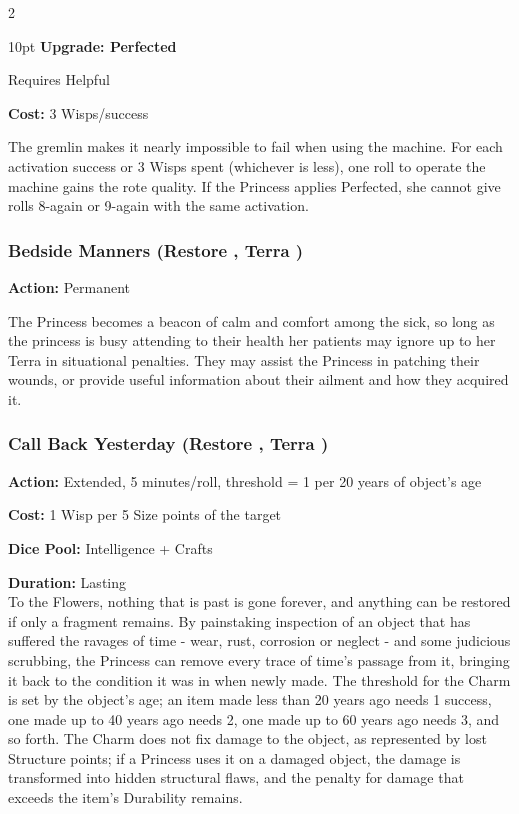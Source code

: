 \begin{multicols}{2}
\begin{myindentpar}{10pt}
\textbf{Upgrade: Perfected}

Requires Helpful

\noindent \textbf{Cost:} 3 Wisps/success

The gremlin makes it nearly impossible to fail when using the machine. For each activation success or 3 Wisps spent (whichever is less), one roll to operate the machine gains the rote quality. If the Princess applies Perfected, she cannot give rolls 8-again or 9-again with the same activation.\end{myindentpar}

\subsubsection*{Bedside Manners (Restore \textbullet, Terra \textbullet)}

\noindent \textbf{Action:} Permanent

\noindent The Princess becomes a beacon of calm and comfort among the sick, so long as the princess is busy attending to their health her patients may ignore up to her Terra in situational penalties. They may assist the Princess in patching their wounds, or provide useful information about their ailment and how they acquired it. 

\subsubsection*{Call Back Yesterday (Restore \textbullet, Terra \textbullet)}

\noindent \textbf{Action:} Extended, 5 minutes/roll, threshold = 1 per 20 years of object's age

\noindent \textbf{Cost:} 1 Wisp per 5 Size points of the target

\noindent \textbf{Dice Pool:} Intelligence + Crafts

\noindent \textbf{Duration:} Lasting \\

\noindent To the Flowers, nothing that is past is gone forever, and anything can be restored if only a fragment remains. By painstaking inspection of an object that has suffered the ravages of time - wear, rust, corrosion or neglect - and some judicious scrubbing, the Princess can remove every trace of time's passage from it, bringing it back to the condition it was in when newly made. The threshold for the Charm is set by the object's age; an item made less than 20 years ago needs 1 success, one made up to 40 years ago needs 2, one made up to 60 years ago needs 3, and so forth. The Charm does not fix damage to the object, as represented by lost Structure points; if a Princess uses it on a damaged object, the damage is transformed into hidden structural flaws, and the penalty for damage that exceeds the item's Durability remains.


\end{multicols}
